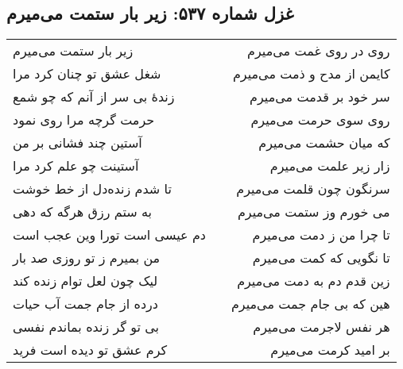 \begin{center}
\section*{غزل شماره ۵۳۷: زیر بار ستمت می‌میرم}
\label{sec:537}
\begin{longtable}{l p{0.5cm} r}
زیر بار ستمت می‌میرم
&&
روی در روی غمت می‌میرم
\\
شغل عشق تو چنان کرد مرا
&&
کایمن از مدح و ذمت می‌میرم
\\
زندهٔ بی سر از آنم که چو شمع
&&
سر خود بر قدمت می‌میرم
\\
حرمت گرچه مرا روی نمود
&&
روی سوی حرمت می‌میرم
\\
آستین چند فشانی بر من
&&
که میان حشمت می‌میرم
\\
آستینت چو علم کرد مرا
&&
زار زیر علمت می‌میرم
\\
تا شدم زنده‌دل از خط خوشت
&&
سرنگون چون قلمت می‌میرم
\\
به ستم رزق هرگه که دهی
&&
می خورم وز ستمت می‌میرم
\\
دم عیسی است تورا وین عجب است
&&
تا چرا من ز دمت می‌میرم
\\
من بمیرم ز تو روزی صد بار
&&
تا نگویی که کمت می‌میرم
\\
لیک چون لعل توام زنده کند
&&
زین قدم دم به دمت می‌میرم
\\
درده از جام جمت آب حیات
&&
هین که بی جام جمت می‌میرم
\\
بی تو گر زنده بماندم نفسی
&&
هر نفس لاجرمت می‌میرم
\\
کرم عشق تو دیده است فرید
&&
بر امید کرمت می‌میرم
\\
\end{longtable}
\end{center}

